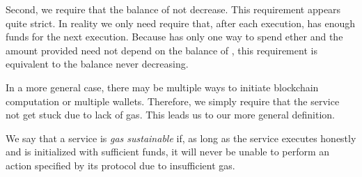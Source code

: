 Second, we require that the balance of \tcadd not decrease.
This requirement appears quite strict.
In reality we only need require that, after each execution, \tc has enough funds for the next execution.
Because \tc has only one way to spend ether and the amount provided need not depend on the balance of \tcadd,
this requirement is equivalent to the balance never decreasing.

In a more general case, there may be multiple ways to initiate blockchain computation or multiple wallets.
Therefore, we simply require that the service not get stuck due to lack of gas.
This leads us to our more general definition.

\begin{definition}
  \label{def:gas-sustainability}
  We say that a service is \emph{gas sustainable} if, as long as the service executes honestly and is initialized with sufficient funds,
  it will never be unable to perform an action specified by its protocol due to insufficient gas.
\end{definition}


